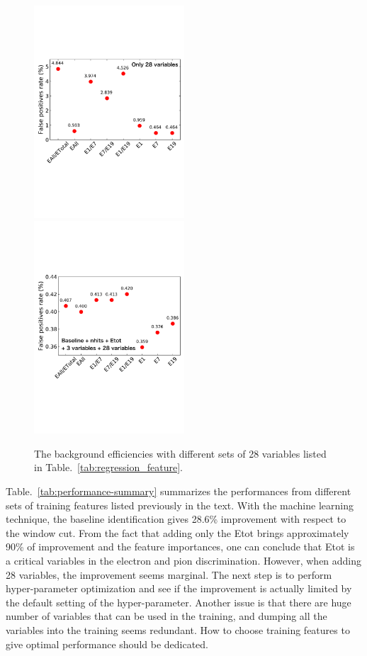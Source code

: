 \begin{figure}[!ht]
    \begin{center}  
    \includegraphics[width=0.5\textwidth]{Fig/fig_HGCAL/Nvar28-FPrate-XGBClassifier}~
    \includegraphics[width=0.5\textwidth]{Fig/fig_HGCAL/Nvar35-FPrate-XGBClassifier}\\
    \caption{The background efficiencies with different sets of 28 variables listed in Table.~\ref{tab:regression_feature}.}
    \label{fig:FPrate-Nvar}
    \end{center}
\end{figure}

Table.~\ref{tab:performance-summary} summarizes the performances from different sets of training features listed previously in the text. With the machine learning technique, the baseline identification gives 28.6\% improvement with respect to the window cut. From the fact that adding only the Etot brings approximately 90\% of improvement and the feature importances, one can conclude that Etot is a critical variables in the electron and pion discrimination. However, when adding 28 variables, the improvement seems marginal. The next step is to perform hyper-parameter optimization and see if the improvement is actually limited by the default setting of the hyper-parameter. Another issue is that there are huge number of variables that can be used in the training, and dumping all the variables into the training seems redundant. How to choose training features to give optimal performance should be dedicated.   

